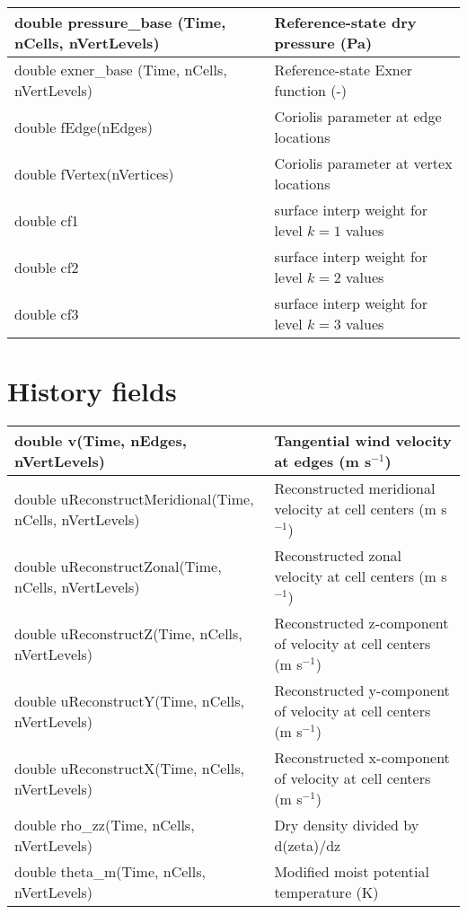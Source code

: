 {\begin{longtable}{|p{2.5in} |p{3.75in}|}
        double pressure\_base \hfil\break (Time, nCells, nVertLevels) & Reference-state dry pressure (Pa) \\ \hline
        double exner\_base \hfil\break (Time, nCells, nVertLevels)    & Reference-state Exner function (-) \\ \hline
        double fEdge(nEdges)         &  Coriolis parameter at edge locations \\ \hline
        double fVertex(nVertices)    &  Coriolis parameter at vertex locations \\ \hline
        double cf1                   &  surface interp weight for level $k=1$ values \\ \hline
        double cf2                   &  surface interp weight for level $k=2$ values \\ \hline
        double cf3                   &  surface interp weight for level $k=3$ values \\ \hline
\end{longtable}
}
        
\section{History fields}

{\small        
\begin{longtable}{|p{2.5in} |p{3.75in}|}
 \hline
        double v(Time, nEdges, nVertLevels)          &        Tangential wind velocity at edges (m s$^{-1}$)  \\ \hline 
        double uReconstructMeridional\hfil\break (Time, nCells, nVertLevels)  & Reconstructed meridional velocity at cell centers (m s$^{-1}$)  \\ \hline
        double uReconstructZonal\hfil\break (Time, nCells, nVertLevels)  &      Reconstructed zonal velocity at cell centers \hfil\break (m s$^{-1}$) \\ \hline
        double uReconstructZ\hfil\break (Time, nCells, nVertLevels)      &      Reconstructed z-component of velocity at cell centers \hfil\break (m s$^{-1}$) \\ \hline
        double uReconstructY\hfil\break (Time, nCells, nVertLevels)      &      Reconstructed y-component of velocity at cell centers \hfil\break (m s$^{-1}$) \\ \hline
        double uReconstructX\hfil\break (Time, nCells, nVertLevels)      &      Reconstructed x-component of velocity at cell centers \hfil\break (m s$^{-1}$)  \\ \hline
        double \hfil\break rho\_zz(Time, nCells, nVertLevels)   &  Dry density divided by d(zeta)/dz \\ \hline
        double \hfil\break theta\_m(Time, nCells, nVertLevels)  &  Modified moist potential temperature (K) \\ \hline
\end{longtable}
}

